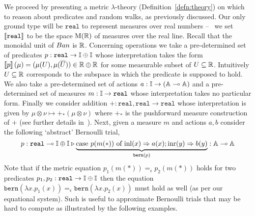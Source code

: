 \documentclass[a4paper,UKenglish,cleveref, autoref, thm-restate]{lipics-v2021}
\begin{document}
We proceed by presenting a metric $\lambda$-theory
(Definition~\ref{defn:theory}) on which to reason about predicates and random
walks, as previously discussed. Our only ground type will be $\mathtt{real}$ to
represent measures over real numbers -- \ie\ we set $\left \llbracket \mathtt{real} \right \rrbracket$ to be
the space $\mathrm{M}(\mathbb{R})$ of measures over the real line. Recall that the
monoidal unit of $\Ban$ is $\mathbb{R}$. Concerning operations we take a
pre-determined set of predicates $p : \mathtt{real} \to \mathbb{I} \oplus \mathbb{I}$
whose interpretation takes the form $\left \llbracket p \right \rrbracket(\mu) = (\mu(U), \mu(\overline{U}))
\in \mathbb{R} \oplus \mathbb{R}$ for some measurable subset of $U \subseteq \mathbb{R}$.
Intuitively $U \subseteq \mathbb{R}$ corresponds to the subspace in which the
predicate is supposed to hold. We also take a pre-determined set of actions $a
: \mathbb{I} \to (\mathbb{A} \multimap \mathbb{A})$ and a pre-determined set of measures $m
: \mathbb{I} \to \mathtt{real}$ whose interpretation takes no particular form.
Finally we consider addition $+ : \mathtt{real},\mathtt{real} \to
\mathtt{real}$ whose interpretation is given by $\mu \otimes \nu \mapsto
+_\ast(\mu \otimes \nu)$ where $+_\ast$ is the pushforward measure construction
of $+$ (see further details in~\cite{dahlqvist22,dahlqvist2023syntactic}).
Next, given a measure $m$ and actions $a,b$ consider the following `abstract'
Bernoulli trial,
\[
        p : \mathtt{real} \multimap \mathbb{I} \oplus \mathbb{I}
        \triangleright \underbrace{ \text{case } p(m(\ast)) \text{ of } \mathrm{inl}(x) \Rightarrow a(x) ; 
        \mathrm{inr}(y) \Rightarrow b(y)}_{\mathtt{bern}(p)} : \mathbb{A} \multimap \mathbb{A}
\]
Note that if the metric equation $p_1(m(\ast)) =_\epsilon p_2(m(\ast))$ holds
for two predicates $p_1, p_2 : \mathtt{real} \to \mathbb{I} \oplus \mathbb{I}$ then the
equation $\mathtt{bern}(\lambda x. p_1(x)) =_\epsilon \mathtt{bern}(\lambda x.
p_2(x))$ must hold as well (as per our equational system). Such is useful to
approximate Bernoulli trials that may be hard to compute as illustrated by the
following examples.
\end{document}
